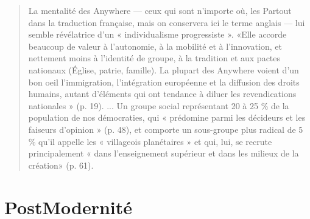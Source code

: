 \begin{quote}
    La mentalité des Anywhere — ceux qui sont n'importe où, les Partout dans la traduction française, mais on conservera ici le terme anglais — lui semble révélatrice d'un « individualisme progressiste ». «Elle accorde beaucoup de valeur à l'autonomie, à la mobilité et à l'innovation, et nettement moins à l'identité de groupe, à la tradition et aux pactes nationaux (Église, patrie, famille). La plupart des Anywhere voient d'un bon oeil l'immigration, l'intégration européenne et la diffusion des droits humains, autant d'éléments qui ont tendance à diluer les revendications nationales » (p. 19). ... Un groupe social représentant 20 à 25 \% de la population de nos démocraties, qui «  prédomine parmi les décideurs et les faiseurs d'opinion » (p. 48), et comporte un sous-groupe plus radical de 5 \% qu'il appelle les « villageois planétaires » et qui, lui, se recrute principalement « dans l'enseignement supérieur et dans les milieux de la création» (p. 61). 
\end{quote}

\newpage


\section{PostModernité}

